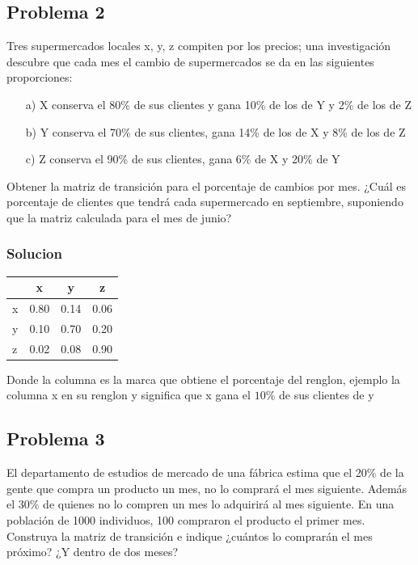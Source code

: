 \documentclass{article}
\begin{document}
\subsection*{Problema 2}

Tres supermercados locales x, y, z compiten por los precios; una investigación descubre que cada mes el cambio de supermercados se da en las siguientes proporciones:
\begin{itemize}
    \item[a)] X conserva el 80\% de sus clientes y gana 10\% de los de Y y 2\% de los de Z
    \item[b)] Y conserva el 70\% de sus clientes, gana 14\% de los de X y 8\% de los de Z
    \item[c)] Z conserva el 90\% de sus clientes, gana 6\% de X y 20\% de Y
\end{itemize}

Obtener la matriz de transición para el porcentaje de cambios por mes. ¿Cuál es porcentaje de clientes que tendrá cada supermercado en septiembre, suponiendo que la matriz calculada para el mes de junio?

\subsubsection*{Solucion}

\begin{table}[ht]
    \centering
    \begin{tabular}{|l|c c c|}
        \hline
          & x    & y    & z    \\ \hline
        x & 0.80 & 0.14 & 0.06 \\
        y & 0.10 & 0.70 & 0.20 \\
        z & 0.02 & 0.08 & 0.90 \\
        \hline
    \end{tabular}
\end{table}

Donde la columna es la marca que obtiene el porcentaje del renglon, ejemplo la columna x en su renglon y significa que x gana el $10\%$ de sus clientes de y

\subsection*{Problema 3}

El departamento de estudios de mercado de una fábrica estima que el 20\% de la gente que compra un producto un mes, no lo comprará el mes siguiente. Además el 30\% de quienes no lo compren un mes lo adquirirá al mes siguiente. En una población de 1000 individuos, 100 compraron el producto el primer mes. Construya la matriz de transición e indique ¿cuántos lo comprarán el mes próximo? ¿Y dentro de dos meses?
\end{document}
